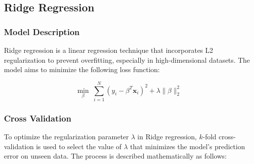 \documentclass{article}
\begin{document}
\subsection{Ridge Regression}

\subsubsection{Model Description}

Ridge regression is a linear regression technique that incorporates L2 regularization to prevent overfitting, especially in high-dimensional datasets. The model aims to minimize the following loss function:

\[
\min_{\beta} \; \sum_{i=1}^{N} \left( y_i - \beta^T \mathbf{x}_i \right)^2 + \lambda \|\beta\|_2^2
\]

\subsubsection{Cross Validation}


To optimize the regularization parameter \(\lambda\) in Ridge regression, \(k\)-fold cross-validation is used to select the value of \(\lambda\) that minimizes the model's prediction error on unseen data. The process is described mathematically as follows:
\end{document}
